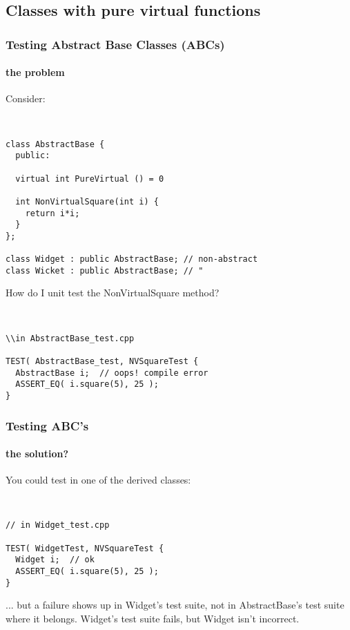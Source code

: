 \subsection{Classes with pure virtual functions}
\begin{frame}[fragile,t]
\frametitle{Testing Abstract Base Classes (ABCs)}
\framesubtitle{the problem}
Consider:
{\scriptsize\
\begin{verbatim}
class AbstractBase {
  public:

  virtual int PureVirtual () = 0

  int NonVirtualSquare(int i) {
    return i*i;
  }
};

class Widget : public AbstractBase; // non-abstract
class Wicket : public AbstractBase; // "
\end{verbatim}}
How do I unit test the NonVirtualSquare method?
{\scriptsize\
\begin{verbatim}
\\in AbstractBase_test.cpp

TEST( AbstractBase_test, NVSquareTest {
  AbstractBase i;  // oops! compile error
  ASSERT_EQ( i.square(5), 25 );
}
\end{verbatim}}
\end{frame}
\begin{frame}[fragile,t]
\frametitle{Testing ABC's}
\framesubtitle{the solution?}
You could test in one of the derived classes:
{\scriptsize\
\begin{verbatim}
// in Widget_test.cpp

TEST( WidgetTest, NVSquareTest {
  Widget i;  // ok
  ASSERT_EQ( i.square(5), 25 );
}
\end{verbatim}}
... but a failure shows up in Widget's test suite, not in
AbstractBase's test suite where it belongs.  Widget's test suite
fails, but Widget isn't incorrect.

\end{frame}

